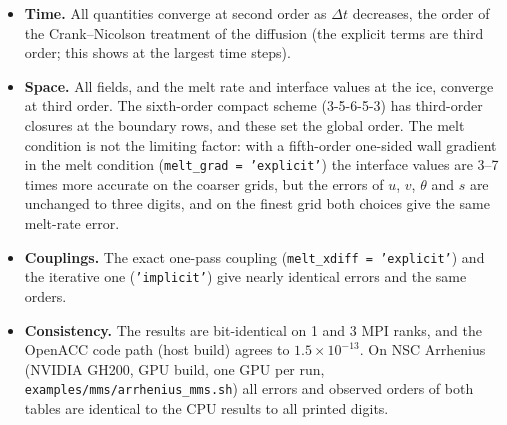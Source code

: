 \documentclass[11pt,a4paper]{article}
\begin{document}
\begin{itemize}
  \item \textbf{Time.} All quantities converge at second order as $\Delta t$ decreases, the order of the
        Crank--Nicolson treatment of the diffusion (the explicit terms are third order; this shows at the
        largest time steps).
  \item \textbf{Space.} All fields, and the melt rate and interface values at the ice, converge at third
        order. The sixth-order compact scheme (3-5-6-5-3) has third-order closures at the boundary rows, and
        these set the global order. The melt condition is not the limiting factor: with a fifth-order
        one-sided wall gradient in the melt condition (\texttt{melt\_grad = 'explicit'}) the interface
        values are 3--7 times more accurate on the coarser grids, but the errors of $u$, $v$, $\theta$ and $s$
        are unchanged to three digits, and on the finest grid both choices give the same melt-rate error.
  \item \textbf{Couplings.} The exact one-pass coupling (\texttt{melt\_xdiff = 'explicit'}) and the
        iterative one (\texttt{'implicit'}) give nearly identical errors and the same orders.
  \item \textbf{Consistency.} The results are bit-identical on 1 and 3 MPI ranks, and the OpenACC code path
        (host build) agrees to $1.5\times10^{-13}$. On NSC Arrhenius (NVIDIA GH200, GPU build, one GPU per
        run, \texttt{examples/mms/arrhenius\_mms.sh}) all errors and observed orders of both tables are
        identical to the CPU results to all printed digits.
\end{itemize}
\end{document}
